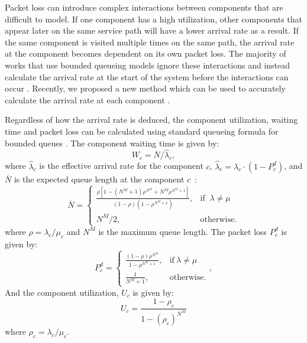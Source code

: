 Packet loss can introduce complex interactions between components that are difficult to model. If one component has a high utilization, other components that appear later on the same service path will have a lower arrival rate as a result. If the same component is visited multiple times on the same path, the arrival rate at the component becomes dependent on its own packet loss. The majority of works that use bounded queueing models ignore these interactions and instead calculate the arrival rate at the start of the system before the interactions can occur \cite{ChuaWZSH16,MarottaZDK17}. Recently, we proposed a new method which can be used to accurately calculate the arrival rate at each component \cite{BillingsleyLMMG22}.

Regardless of how the arrival rate is deduced, the component utilization, waiting time and packet loss can be calculated using standard queueing formula for bounded queues \cite{Kleinrock75}. The component waiting time is given by:
\begin{equation}
	W_c=\overline{N}/\hat{\lambda}_c,
    \label{eq:mm1k_wt}
\end{equation}
where $\hat{\lambda}_c$ is the effective arrival rate for the component $c$, $\hat{\lambda}_c = \lambda_c\cdot\left(1-P^d_c \right)$, and $\overline{N}$ is the expected queue length at the component $c$~\cite{Kleinrock75}:
\begin{equation}
	\overline{N} = \begin{cases}
		\frac{\rho[1 - (N^M + 1)\rho^{N^M} + N^M\rho^{N^M+1}]}{(1 - \rho)(1 - \rho^{N^M+1})} , & \text{if } \ \lambda \neq \mu \\
		N^M/2,                                                                      & \text{otherwise.}
	\end{cases}
\end{equation}
where $\rho=\lambda_{c}/\mu_{c}$ and $N^M$ is the maximum queue length. The packet loss $P^d_c$ is given by:
\begin{equation}
    P^d_{c}
	=
	\begin{cases}
		\frac{(1-\rho)\rho^{N^M}}{1-\rho^{N^M+1}}, & \text{if}\ \lambda\neq\mu\\
        \frac{1}{N^M+1}, & \text{otherwise}.
	\end{cases},
	\label{eq:mm1k_pl}
\end{equation}
And the component utilization, $U_c$ is given by:
\begin{equation}
    U_c = \frac{1 - \rho_c}{1 - (\rho_c)^{N^M}}
    \label{eq:mm1k_utilization}
\end{equation}
where $\rho_c = \lambda_c / \mu_c$. 

